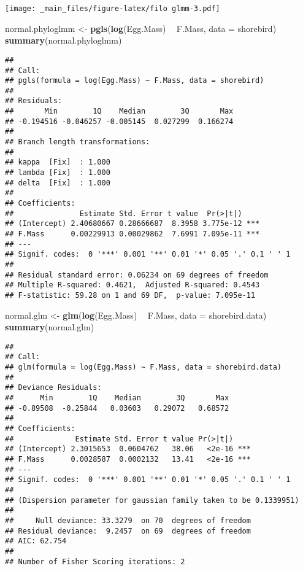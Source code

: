 \documentclass[
]{book}
\newenvironment{Shaded}{\begin{snugshade}}{\end{snugshade}}
\newcommand{\DataTypeTok}[1]{\textcolor[rgb]{0.13,0.29,0.53}{#1}}
\newcommand{\KeywordTok}[1]{\textcolor[rgb]{0.13,0.29,0.53}{\textbf{#1}}}
\newcommand{\NormalTok}[1]{#1}
\newcommand{\OperatorTok}[1]{\textcolor[rgb]{0.81,0.36,0.00}{\textbf{#1}}}
\newcommand{\StringTok}[1]{\textcolor[rgb]{0.31,0.60,0.02}{#1}}
\begin{document}
\texttt{[image: \_main\_files/figure-latex/filo glmm-3.pdf]}

\begin{Shaded}
\begin{Highlighting}[]
\NormalTok{normal.phyloglmm <-}\StringTok{ }\KeywordTok{pgls}\NormalTok{(}\KeywordTok{log}\NormalTok{(Egg.Mass) }\OperatorTok{~}\StringTok{ }\NormalTok{F.Mass, }\DataTypeTok{data =}\NormalTok{ shorebird)}
\KeywordTok{summary}\NormalTok{(normal.phyloglmm)}
\end{Highlighting}
\end{Shaded}

\begin{verbatim}
## 
## Call:
## pgls(formula = log(Egg.Mass) ~ F.Mass, data = shorebird)
## 
## Residuals:
##       Min        1Q    Median        3Q       Max 
## -0.194516 -0.046257 -0.005145  0.027299  0.166274 
## 
## Branch length transformations:
## 
## kappa  [Fix]  : 1.000
## lambda [Fix]  : 1.000
## delta  [Fix]  : 1.000
## 
## Coefficients:
##               Estimate Std. Error t value  Pr(>|t|)    
## (Intercept) 2.40680667 0.28666687  8.3958 3.775e-12 ***
## F.Mass      0.00229913 0.00029862  7.6991 7.095e-11 ***
## ---
## Signif. codes:  0 '***' 0.001 '**' 0.01 '*' 0.05 '.' 0.1 ' ' 1
## 
## Residual standard error: 0.06234 on 69 degrees of freedom
## Multiple R-squared: 0.4621,  Adjusted R-squared: 0.4543 
## F-statistic: 59.28 on 1 and 69 DF,  p-value: 7.095e-11
\end{verbatim}

\begin{Shaded}
\begin{Highlighting}[]
\NormalTok{normal.glm <-}\StringTok{ }\KeywordTok{glm}\NormalTok{(}\KeywordTok{log}\NormalTok{(Egg.Mass) }\OperatorTok{~}\StringTok{ }\NormalTok{F.Mass, }\DataTypeTok{data =}\NormalTok{ shorebird.data)}
\KeywordTok{summary}\NormalTok{(normal.glm)}
\end{Highlighting}
\end{Shaded}

\begin{verbatim}
## 
## Call:
## glm(formula = log(Egg.Mass) ~ F.Mass, data = shorebird.data)
## 
## Deviance Residuals: 
##      Min        1Q    Median        3Q       Max  
## -0.89508  -0.25844   0.03603   0.29072   0.68572  
## 
## Coefficients:
##              Estimate Std. Error t value Pr(>|t|)    
## (Intercept) 2.3015653  0.0604762   38.06   <2e-16 ***
## F.Mass      0.0028587  0.0002132   13.41   <2e-16 ***
## ---
## Signif. codes:  0 '***' 0.001 '**' 0.01 '*' 0.05 '.' 0.1 ' ' 1
## 
## (Dispersion parameter for gaussian family taken to be 0.1339951)
## 
##     Null deviance: 33.3279  on 70  degrees of freedom
## Residual deviance:  9.2457  on 69  degrees of freedom
## AIC: 62.754
## 
## Number of Fisher Scoring iterations: 2
\end{verbatim}
\end{document}

